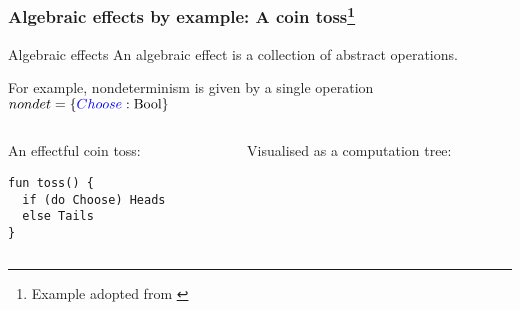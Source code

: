 \documentclass[10pt,compress]{beamer}
\begin{document}
\begin{frame}[fragile]
  \frametitle{Algebraic effects by example: A coin toss\footnote{Example adopted from \citet{Kammar2013}}}
  \begin{block}{Algebraic effects}
    An algebraic effect is a collection of abstract operations.    
  \end{block}
For example, nondeterminism is given by a single operation $nondet = \{{\color{blue}{Choose}} : \text{Bool}\}$
\vspace{1cm}
\begin{columns}
\begin{column}{0.5\textwidth}
An effectful coin toss:
\begin{lstlisting}
fun toss() {
  if (do Choose) Heads
  else Tails
} 
\end{lstlisting}
\end{column}
\begin{column}{0.5\textwidth}
Visualised as a computation tree:
\end{column}
\end{columns}
\end{frame}
\end{document}
